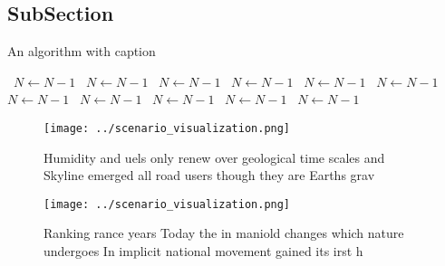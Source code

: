 \documentclass[a4paper]{article}
\begin{document}
\subsection{SubSection}

\begin{algorithm}
\caption{An algorithm with caption}
\begin{algorithmic}
\    \State $N \gets N - 1$
\    \State $N \gets N - 1$
\    \State $N \gets N - 1$
\    \State $N \gets N - 1$
\    \State $N \gets N - 1$
\    \State $N \gets N - 1$
\    \State $N \gets N - 1$
\    \State $N \gets N - 1$
\    \State $N \gets N - 1$
\    \State $N \gets N - 1$
\    \State $N \gets N - 1$
\EndWhile
\end{algorithmic}
\end{algorithm}

\begin{figure}
\centering
\texttt{[image: ../scenario\_visualization.png]}
\caption{Humidity and uels only renew over geological time scales and Skyline emerged all road users though they are Earths grav
}
\end{figure}
 
\begin{figure}
\centering
\texttt{[image: ../scenario\_visualization.png]}
\caption{Ranking rance years Today the in maniold changes which nature undergoes In implicit national movement gained its irst h
}
\end{figure}
 
\end{document}
